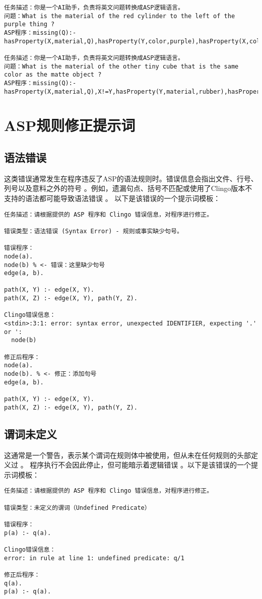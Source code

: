 \begin{lstlisting}
任务描述：你是一个AI助手，负责将英文问题转换成ASP逻辑语言。
问题：What is the material of the red cylinder to the left of the purple thing ? 
ASP程序：missing(Q):-hasProperty(X,material,Q),hasProperty(Y,color,purple),hasProperty(X,color,red),hasProperty(X,shape,cylinder),left(Y,X),X!=Y. 

任务描述：你是一个AI助手，负责将英文问题转换成ASP逻辑语言。
问题：What is the material of the other tiny cube that is the same color as the matte object ? 
ASP程序：missing(Q):-hasProperty(X,material,Q),X!=Y,hasProperty(Y,material,rubber),hasProperty(X,shape,cube),hasProperty(X,size,small),same_color(Y,X). 
\end{lstlisting}

\section{ASP规则修正提示词}
\label{appendix:rule-fix}
\subsection{语法错误}
这类错误通常发生在程序违反了ASP的语法规则时。错误信息会指出文件、行号、列号以及意料之外的符号 。例如，遗漏句点、括号不匹配或使用了Clingo版本不支持的语法都可能导致语法错误 。
以下是该错误的一个提示词模板：
\begin{lstlisting}
任务描述：请根据提供的 ASP 程序和 Clingo 错误信息，对程序进行修正。

错误类型：语法错误 (Syntax Error) - 规则或事实缺少句号。

错误程序：
node(a).
node(b) % <- 错误：这里缺少句号
edge(a, b).

path(X, Y) :- edge(X, Y).
path(X, Z) :- edge(X, Y), path(Y, Z).

Clingo错误信息：
<stdin>:3:1: error: syntax error, unexpected IDENTIFIER, expecting '.' or ':
  node(b)

修正后程序：
node(a).
node(b). % <- 修正：添加句号
edge(a, b).

path(X, Y) :- edge(X, Y).
path(X, Z) :- edge(X, Y), path(Y, Z).
\end{lstlisting}
\subsection{谓词未定义}
这通常是一个警告，表示某个谓词在规则体中被使用，但从未在任何规则的头部定义过 。
程序执行不会因此停止，但可能暗示着逻辑错误 。以下是该错误的一个提示词模板：
\begin{lstlisting}
任务描述：请根据提供的 ASP 程序和 Clingo 错误信息，对程序进行修正。

错误类型：未定义的谓词（Undefined Predicate）

错误程序：
p(a) :- q(a).

Clingo错误信息：
error: in rule at line 1: undefined predicate: q/1

修正后程序：
q(a).
p(a) :- q(a).
\end{lstlisting}
